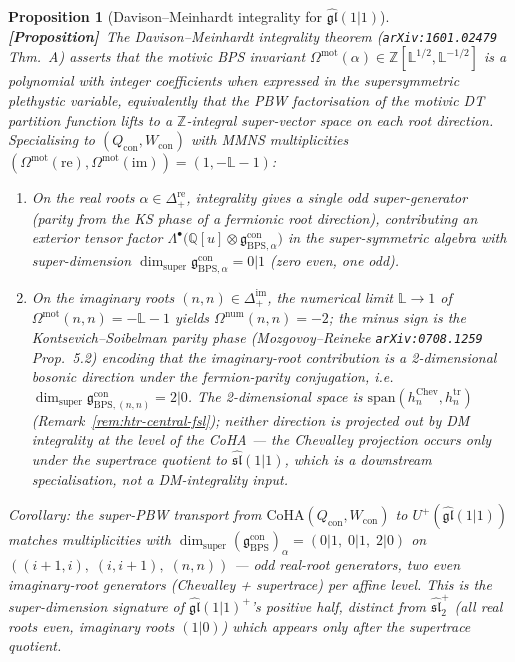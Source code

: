 \documentclass[11pt]{amsart}
\newtheorem{proposition}[theorem]{Proposition}
\theoremstyle{definition}
\providecommand{\CoHA}{\mathrm{CoHA}}
\providecommand{\bZ}{\mathbb{Z}}
\providecommand{\bL}{\mathbb{L}}
\providecommand{\bQ}{\mathbb{Q}}
\providecommand{\fgl}{\mathfrak{gl}}
\providecommand{\fsl}{\mathfrak{sl}}
\providecommand{\fg}{\mathfrak{g}}
\providecommand{\ClaimStatusProposition}{\textbf{\textsf{[Proposition]}}}
\begin{document}
\begin{proposition}[Davison--Meinhardt integrality for $\widehat{\fgl}(1|1)$]
\label{prop:dm-integrality-gl11}
\ClaimStatusProposition\
The Davison--Meinhardt integrality theorem (\texttt{arXiv:1601.02479}
Thm.~A) asserts that the motivic BPS invariant
$\Omega^{\mathrm{mot}}(\alpha) \in \bZ[\bL^{1/2}, \bL^{-1/2}]$ is a
polynomial with integer coefficients when expressed in the supersymmetric
plethystic variable, equivalently that the PBW factorisation of the
motivic DT partition function lifts to a $\bZ$-integral super-vector
space on each root direction. Specialising to $(Q_{\mathrm{con}},
W_{\mathrm{con}})$ with MMNS multiplicities
$(\Omega^{\mathrm{mot}}(\mathrm{re}), \Omega^{\mathrm{mot}}(\mathrm{im}))
= (1, -\bL - 1)$:
\begin{enumerate}[label=\emph{(\roman*)}, leftmargin=2em]
\item On the real roots $\alpha \in \Delta_+^{\mathrm{re}}$, integrality
  gives a single \emph{odd} super-generator (parity from the KS phase
  of a fermionic root direction), contributing an exterior tensor factor
  $\Lambda^\bullet\bigl(\bQ[u] \otimes \fg^{\mathrm{con}}_{\mathrm{BPS},
  \alpha}\bigr)$ in the super-symmetric algebra with super-dimension
  $\dim_{\mathrm{super}} \fg^{\mathrm{con}}_{\mathrm{BPS}, \alpha} = 0|1$
  (zero even, one odd).
\item On the imaginary roots $(n, n) \in \Delta_+^{\mathrm{im}}$, the
  numerical limit $\bL \to 1$ of $\Omega^{\mathrm{mot}}(n,n) = -\bL - 1$
  yields $\Omega^{\mathrm{num}}(n, n) = -2$; the minus sign is the
  Kontsevich--Soibelman parity phase (Mozgovoy--Reineke
  \texttt{arXiv:0708.1259} Prop.~5.2) encoding that the imaginary-root
  contribution is a \emph{2-dimensional bosonic} direction under the
  fermion-parity conjugation, i.e.\ $\dim_{\mathrm{super}}
  \fg^{\mathrm{con}}_{\mathrm{BPS}, (n,n)} = 2|0$. The 2-dimensional
  space is $\mathrm{span}(h^{\mathrm{Chev}}_n, h^{\mathrm{tr}}_n)$
  (Remark~\ref{rem:htr-central-fsl}); neither direction is projected
  out by DM integrality at the level of the CoHA — the Chevalley
  projection occurs only under the supertrace quotient to
  $\widehat{\fsl}(1|1)$, which is a downstream specialisation, not a
  DM-integrality input.
\end{enumerate}
Corollary: the super-PBW transport from $\CoHA(Q_{\mathrm{con}},
W_{\mathrm{con}})$ to $U^+(\widehat{\fgl}(1|1))$ matches multiplicities
with $\dim_{\mathrm{super}} (\fg_{\mathrm{BPS}}^{\mathrm{con}})_\alpha =
(0|1,\; 0|1,\; 2|0)$ on $((i{+}1, i),\; (i, i{+}1),\; (n, n))$ --- odd
real-root generators, two even imaginary-root generators (Chevalley +
supertrace) per affine level. This is the super-dimension signature of
$\widehat{\fgl}(1|1)^+$'s positive half, distinct from $\widehat{\fsl}_2^+$
(all real roots even, imaginary roots $(1|0)$) which appears only after
the supertrace quotient.
\end{proposition}
\end{document}
